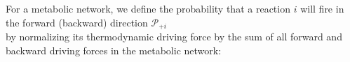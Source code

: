 For a metabolic network, we define the probability that a reaction $i$ will fire in the forward (backward)  direction ${\mathcal P_{+i}}$ \\ by normalizing its thermodynamic driving force by the sum of all forward and backward driving forces in the metabolic network: